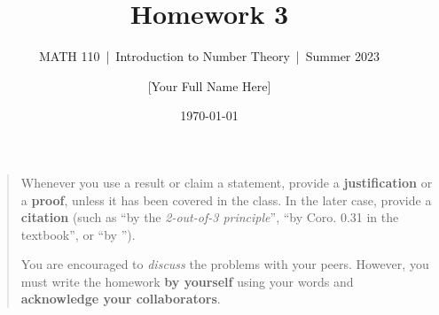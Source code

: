\documentclass[11pt]{article}
\title{Homework 3}
\author{[Your Full Name Here]}
\subtitle{MATH 110~|~Introduction to Number Theory~|~Summer 2023}
\date{\today}
\theoremstyle{plain}
\theoremstyle{definition}
\theoremstyle{remark}
\numberwithin{equation}{problem}
\begin{document}
\maketitle

\begin{quotation}
	Whenever you use a result or claim a statement, provide a \textbf{justification} or a \textbf{proof}, unless it has been covered in the class. In the later case, provide a \textbf{citation} (such as ``by the \emph{2-out-of-3 principle}'', ``by Coro. 0.31 in the textbook'', or ``by \cite[Coro. 0.31]{texbook}'').

	You are encouraged to \emph{discuss} the problems with your peers. However, you must write the homework \textbf{by yourself} using your words and \textbf{acknowledge your collaborators}.
\end{quotation}
\end{document}
